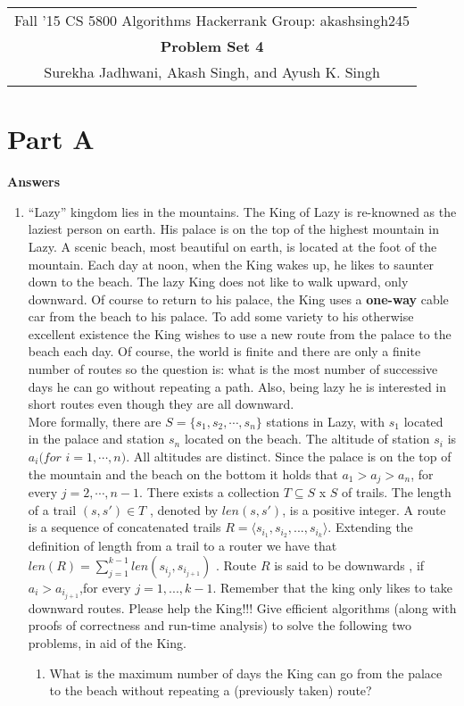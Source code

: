 \documentclass[12pt]{article}
\begin{document}
\begin{center}
\begin{tabular}{|c|}
\hline
Fall '15 CS 5800 Algorithms \hspace{5cm} Hackerrank Group: akashsingh245\\
{\bfseries \large Problem Set 4}\\
Surekha Jadhwani, Akash Singh, and Ayush K. Singh\\
\hline
\end{tabular}
\end{center}

\section{Part A}
\textbf{\large{Answers}}
\begin{enumerate}
\item ``Lazy'' kingdom lies in the mountains. The King of Lazy is re-knowned as the laziest person on earth. His palace is on the top of the highest mountain in Lazy. A scenic beach, most beautiful on earth, is located at the foot of the mountain. Each day at noon, when the King wakes up, he likes to saunter down to the beach. The lazy King does not like to walk upward, only downward. Of course to return to his palace, the King uses a \textbf{one-way} cable car from the beach to his palace. To add some variety to his otherwise excellent existence the King wishes to use a new route from the palace to the beach each day. Of course, the world is finite and there are only a finite number of routes so the question is: what is the most number of successive days he can go without repeating a path. Also, being lazy he is interested in short routes even though they are all downward.\\
More formally, there are $S = \{s_1,s_2,\cdots,s_n\}$ stations in Lazy, with $s_1$ located in the palace and station $s_n$ located on the beach. The altitude of station $s_i$ is $a_i (for$ $i =
1,\cdots,n)$. All altitudes are distinct. Since the palace is on the top of the mountain and the beach on the bottom it holds that $a_1 > a_j > a_n$, for every $j = 2,\cdots,n - 1$.
There exists a collection $T \subseteq S$ x $S$ of trails. The length of a trail $(s, s') \in T$ , denoted by $len(s, s')$, is a positive integer. A route is a sequence of concatenated trails
$R = \langle s_{i_1}, s_{i_2} , ..., s_{i_k} \rangle$. Extending the definition of length from a trail to a router we have that $len(R) = \sum_{j=1}^{k - 1} len(s_{i_j},s_{i_{j+1}}) $ . Route $R$ is said to be downwards , if $a_i > a_{i_{j+1}} $,for every $j = 1, ..., k - 1$. Remember that the king only likes to take downward routes. Please help the King!!! Give efficient algorithms (along with proofs of correctness and run-time analysis) to solve the following two problems, in aid of the King. 
\begin{enumerate}
\item What is the maximum number of days the King can go from the palace to the beach without repeating a (previously taken) route?


\end{enumerate}
\end{enumerate}
\end{document}
